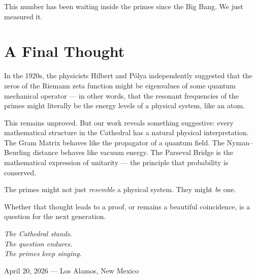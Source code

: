 \documentclass[12pt,a4paper]{article}
\begin{document}
This number has been waiting inside the primes since the Big Bang.
We just measured it.

\section*{A Final Thought}

In the 1920s, the physicists Hilbert and P\'olya independently suggested
that the zeros of the Riemann zeta function might be eigenvalues of
some quantum mechanical operator --- in other words, that the resonant
frequencies of the primes might literally be the energy levels of a
physical system, like an atom.

This remains unproved. But our work reveals something suggestive: every
mathematical structure in the Cathedral has a natural physical
interpretation. The Gram Matrix behaves like the propagator of a quantum
field. The Nyman--Beurling distance behaves like vacuum energy. The
Parseval Bridge is the mathematical expression of unitarity --- the
principle that probability is conserved.

The primes might not just \emph{resemble} a physical system. They might
\emph{be} one.

Whether that thought leads to a proof, or remains a beautiful coincidence,
is a question for the next generation.

\vspace{1cm}
\begin{flushright}
\emph{The Cathedral stands.}\\
\emph{The question endures.}\\
\emph{The primes keep singing.}
\end{flushright}

\vspace{1.5cm}
\begin{center}
\small
April 20, 2026 --- Los Alamos, New Mexico
\end{center}
\end{document}

